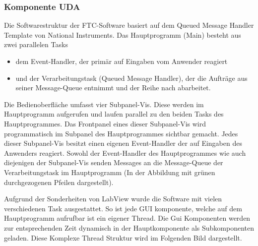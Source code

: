 \documentclass[10pt]{scrartcl}
\begin{document}
\subsubsection{Komponente UDA}
Die Softwarestruktur der FTC-Software basiert auf dem Queued Message Handler Template von National Instruments. Das Hauptprogramm (Main) besteht aus zwei parallelen Tasks
\begin{itemize}
	\item dem Event-Handler, der primär auf Eingaben vom Anwender reagiert
	\item und der Verarbeitungstask (Queued Message Handler), der die Aufträge aus seiner Message-Queue entnimmt und der Reihe nach abarbeitet.
\end{itemize}

Die Bedienoberfläche umfasst vier Subpanel-Vis. Diese werden im Hauptprogramm aufgerufen und laufen parallel zu den beiden Tasks des Hauptprogrammes. Das Frontpanel eines dieser Subpanel-Vis wird programmatisch im Subpanel des Hauptprogrammes sichtbar gemacht.  
Jedes dieser Subpanel-Vis besitzt einen eigenen Event-Handler der auf Eingaben des Anwenders reagiert. Sowohl der Event-Handler des Hauptprogrammes wie auch diejenigen der Subpanel-Vis senden Messages an die Message-Queue der Verarbeitungstask im Hauptprogramm (In der Abbildung mit grünen durchgezogenen Pfeilen dargestellt).

Aufgrund der Sonderheiten von LabView wurde die Software mit vielen verschiedenen Task ausgestattet. So ist jede GUI komponente, welche auf dem Hauptprogramm aufrufbar ist ein eigener Thread. Die Gui Komponenten werden zur entsprechenden Zeit dynamisch in der Hauptkomponente als Subkomponenten geladen. Diese Komplexe Thread Struktur wird im Folgenden Bild dargestellt.
\end{document}
